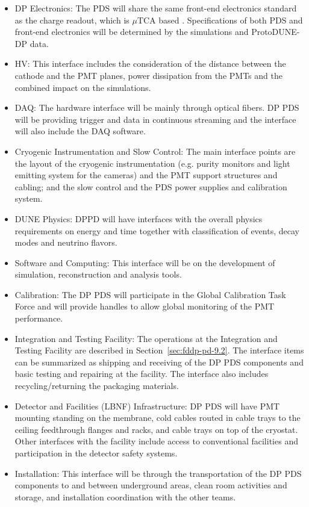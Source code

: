 \begin{itemize}

\item DP Electronics: The PDS will share the same front-end electronics standard as the charge readout, which is $\mu$TCA based \cite{utca}. Specifications of both PDS and front-end electronics will be determined by the simulations and ProtoDUNE-DP data.

\item HV: This interface includes the consideration of the distance between the cathode and the PMT planes, power dissipation from the PMTs and the combined impact on the simulations.

\item DAQ: The hardware interface will be mainly through optical fibers. DP PDS will be providing trigger and data in continuous streaming and the interface will also include the DAQ software.

\item Cryogenic Instrumentation and Slow Control: The main interface points are the layout of the cryogenic instrumentation (e.g. purity monitors and light emitting system for the cameras) and the PMT support structures and cabling; and the slow control and the PDS power supplies and calibration system.

\item DUNE Physics: DPPD will have interfaces with the overall physics requirements on energy and time together with classification of events, decay modes and neutrino flavors.

\item Software and Computing: This interface will be on the development of simulation, reconstruction and analysis tools.

\item Calibration: The DP PDS will participate in the Global Calibration Task Force and will provide handles to allow global monitoring of the PMT performance.

\item Integration and Testing Facility: The operations at the Integration and Testing Facility are described in Section~\ref{sec:fddp-pd-9.2}. The interface items can be summarized as shipping and receiving of the DP PDS components and basic testing and repairing at the facility. The interface also includes recycling/returning the packaging materials.

\item Detector and Facilities (LBNF) Infrastructure: DP PDS will have PMT mounting standing on the membrane, cold cables routed in cable trays to the ceiling feedthrough flanges and racks, and cable trays on top of the cryostat. Other interfaces with the facility include access to conventional facilities and participation in the detector safety systems. 

\item Installation: This interface will be through the transportation of the DP PDS components to and between underground areas, clean room activities and storage, and installation coordination with the other teams. 

\end{itemize}

